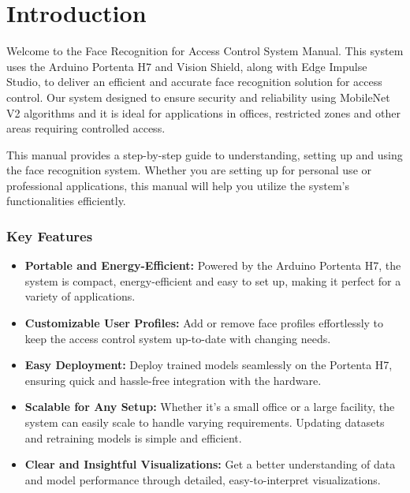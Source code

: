 %
%

\chapter{Introduction}

Welcome to the Face Recognition for Access Control System Manual. This system uses the Arduino Portenta H7 and Vision Shield, along with Edge Impulse Studio, to deliver an efficient and accurate face recognition solution for access control. Our system designed to ensure security and reliability using MobileNet V2 algorithms and it is ideal for applications in offices, restricted zones and other areas requiring controlled access.


This manual provides a step-by-step guide to understanding, setting up and using the face recognition system. Whether you are setting up for personal use or professional applications, this manual will help you utilize the system's functionalities efficiently.

\subsection{Key Features}

\begin{itemize}
\item \textbf{Portable and Energy-Efficient:}  
Powered by the Arduino Portenta H7, the system is compact, energy-efficient and easy to set up, making it perfect for a variety of applications.
\item \textbf{Customizable User Profiles:}  
Add or remove face profiles effortlessly to keep the access control system up-to-date with changing needs.
\item \textbf{Easy Deployment:}  
Deploy trained models seamlessly on the Portenta H7, ensuring quick and hassle-free integration with the hardware.
\item \textbf{Scalable for Any Setup:}  
Whether it’s a small office or a large facility, the system can easily scale to handle varying requirements. Updating datasets and retraining models is simple and efficient.
\item \textbf{Clear and Insightful Visualizations:}  
Get a better understanding of data and model performance through detailed, easy-to-interpret visualizations.
\end{itemize}


